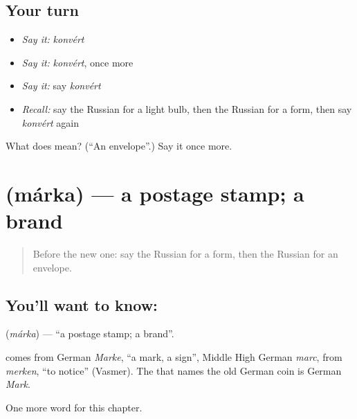 \subsection*{Your turn}
\begin{itemize}
\raggedright
  \item \emph{Say it:} \emph{konvért}
  \item \emph{Say it:} \emph{konvért}, once more
  \item \emph{Say it:} say \emph{konvért}
  \item \emph{Recall:} say the Russian for a light bulb, then the Russian for a form, then say \emph{konvért} again
\end{itemize}

\begin{tcolorbox}[breakable,colback=teal!4,colframe=teal!35!black,title={Before you move on}]
What does  mean? (\textquotedblleft{}An envelope\textquotedblright{}.) Say it once more.
\end{tcolorbox}
\section[\texorpdfstring{\ru{марка} (márka)}{марка (márka)}]{ (márka) — a postage stamp; a brand}

\label{lesson:RU-C161-marka}



\begin{quote}
Before the new one: say the Russian for a form, then the Russian for an envelope.
\end{quote}

\subsection*{You'll want to know: }
\textbf{} (\emph{márka}) — \textquotedblleft{}a postage stamp; a brand\textquotedblright{}.

\begin{cousinweb}
\textbf{} comes from German \emph{Marke}, \textquotedblleft{}a mark, a sign\textquotedblright{}, Middle High German \emph{marc}, from \emph{merken}, \textquotedblleft{}to notice\textquotedblright{} (Vasmer). The \emph{} that names the old German coin is German \emph{Mark}.
\end{cousinweb}

\begin{grammarlens}[title={What you've built}]
One more word for this chapter.
\end{grammarlens}

